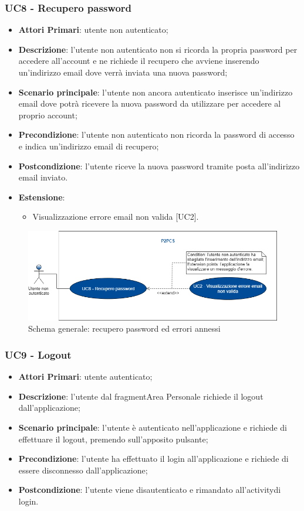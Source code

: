 \subsubsection{UC8 - Recupero password}
\begin{itemize}
	\item \textbf{Attori Primari}: utente non autenticato;
	\item \textbf{Descrizione}: l'utente non autenticato non si ricorda la propria password per accedere all'account e ne richiede il recupero che avviene inserendo un'indirizzo email dove verrà inviata una nuova password;
	\item \textbf{Scenario principale}: l'utente non ancora autenticato inserisce un'indirizzo email dove potrà ricevere la nuova password da utilizzare per accedere al proprio account; 
	\item \textbf{Precondizione}: l'utente non autenticato non ricorda la password di accesso e indica un'indirizzo email di recupero;
	\item \textbf{Postcondizione}: l'utente riceve la nuova password tramite posta all'indirizzo email inviato.
	\item \textbf{Estensione}:
		\begin{itemize}
			\item Visualizzazione errore email non valida [UC2].
		\end{itemize}
\end{itemize}
\begin{figure}[h]
	\includegraphics[width=15cm]{res/images/Schemagenerale3.png}
	\centering
	\caption{Schema generale: recupero password ed errori annessi}
\end{figure}

\subsubsection{UC9 - Logout}
\begin{itemize}
	\item \textbf{Attori Primari}:
	utente autenticato;
	\item \textbf{Descrizione}: l'utente dal fragment\glosp Area Personale richiede il logout dall'applicazione;
	\item \textbf{Scenario principale}: l'utente è autenticato nell'applicazione e richiede di effettuare il logout, premendo sull'apposito pulsante;
	\item \textbf{Precondizione}: l'utente ha effettuato il login all'applicazione e richiede di essere disconnesso dall'applicazione;
	\item \textbf{Postcondizione}: l'utente viene disautenticato e rimandato all'activity\glosp di login. 
\end{itemize}


